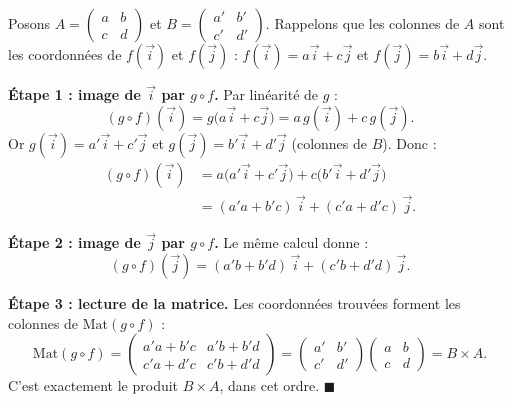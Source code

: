\documentclass[11pt]{article}
\begin{document}
\begin{experience}[Démonstration guidée : pourquoi $\mathrm{Mat}(g \circ f) = BA$ ?]
Posons $A = \begin{pmatrix} a & b \\ c & d \end{pmatrix}$ et $B = \begin{pmatrix} a' & b' \\ c' & d' \end{pmatrix}$. Rappelons que les colonnes de $A$ sont les coordonnées de $f(\vec{i})$ et $f(\vec{j})$ : $f(\vec{i}) = a\vec{i} + c\vec{j}$ et $f(\vec{j}) = b\vec{i} + d\vec{j}$.

\textbf{Étape 1 : image de $\vec{i}$ par $g \circ f$.} Par linéarité de $g$ :
\[ (g \circ f)(\vec{i}) = g\bigl(a\vec{i} + c\vec{j}\bigr) = a\,g(\vec{i}) + c\,g(\vec{j}). \]
Or $g(\vec{i}) = a'\vec{i} + c'\vec{j}$ et $g(\vec{j}) = b'\vec{i} + d'\vec{j}$ (colonnes de $B$). Donc :
\begin{align*}
(g \circ f)(\vec{i}) &= a\bigl(a'\vec{i} + c'\vec{j}\bigr) + c\bigl(b'\vec{i} + d'\vec{j}\bigr) \\
&= (a'a + b'c)\,\vec{i} + (c'a + d'c)\,\vec{j}.
\end{align*}

\textbf{Étape 2 : image de $\vec{j}$ par $g \circ f$.} Le même calcul donne :
\[ (g \circ f)(\vec{j}) = (a'b + b'd)\,\vec{i} + (c'b + d'd)\,\vec{j}. \]

\textbf{Étape 3 : lecture de la matrice.} Les coordonnées trouvées forment les colonnes de $\mathrm{Mat}(g \circ f)$ :
\[ \mathrm{Mat}(g \circ f) = \begin{pmatrix} a'a + b'c & a'b + b'd \\ c'a + d'c & c'b + d'd \end{pmatrix} = \begin{pmatrix} a' & b' \\ c' & d' \end{pmatrix} \begin{pmatrix} a & b \\ c & d \end{pmatrix} = B \times A. \]
C'est exactement le produit $B \times A$, dans cet ordre. $\blacksquare$
\end{experience}
\end{document}
